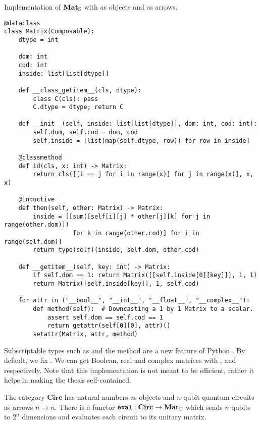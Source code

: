 \begin{python}\label{listing:matrix}
{\normalfont Implementation of $\mathbf{Mat}_\S$ with  as objects and  as arrows.}

\begin{verbatim}
@dataclass
class Matrix(Composable):
    dtype = int

    dom: int
    cod: int
    inside: list[list[dtype]]

    def __class_getitem__(cls, dtype):
        class C(cls): pass
        C.dtype = dtype; return C

    def __init__(self, inside: list[list[dtype]], dom: int, cod: int):
        self.dom, self.cod = dom, cod
        self.inside = [list(map(self.dtype, row)) for row in inside]

    @classmethod
    def id(cls, x: int) -> Matrix:
        return cls([[i == j for i in range(x)] for j in range(x)], x, x)

    @inductive
    def then(self, other: Matrix) -> Matrix:
        inside = [[sum([self[i][j] * other[j][k] for j in range(other.dom)])
                   for k in range(other.cod)] for i in range(self.dom)]
        return type(self)(inside, self.dom, other.cod)

    def __getitem__(self, key: int) -> Matrix:
        if self.dom == 1: return Matrix([[self.inside[0][key]]], 1, 1)
        return Matrix([self.inside[key]], 1, self.cod)

    for attr in ("__bool__", "__int__", "__float__", "__complex__"):
        def method(self):  # Downcasting a 1 by 1 Matrix to a scalar.
            assert self.dom == self.cod == 1
            return getattr(self[0][0], attr)()
        setattr(Matrix, attr, method)
\end{verbatim}

Subscriptable types such as  and the  method are a new feature of Python .
By default, we fix .
We can get Boolean, real and complex matrices with ,  and  respectively.
Note that this implementation is not meant to be efficient, rather it helps in making the thesis self-contained.
\end{python}

\begin{example}
The category $\mathbf{Circ}$ has natural numbers as objects and $n$-qubit quantum circuits as arrows $n \to n$.
There is a functor $\mathtt{eval} : \mathbf{Circ} \to \mathbf{Mat}_\C$ which sends $n$ qubits to $2^n$ dimensions and evaluates each circuit to its unitary matrix.
\end{example}

